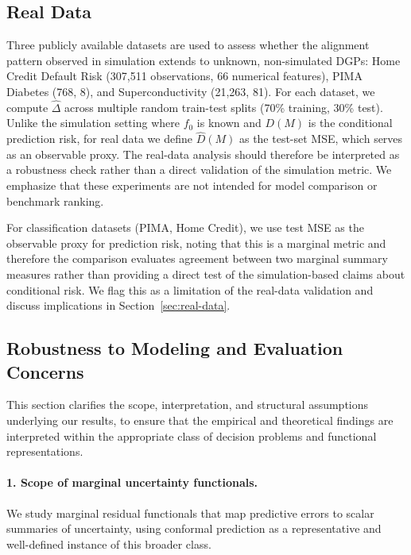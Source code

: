 \documentclass[a4paper,11pt]{article}
\begin{document}
\subsection{Real Data}
\label{sec:real-data-design}

Three publicly available datasets are used to assess whether the alignment pattern observed in simulation extends to unknown, non-simulated DGPs: Home Credit Default Risk (307,511 observations, 66 numerical features), PIMA Diabetes (768, 8), and Superconductivity (21,263, 81). For each dataset, we compute $\hat{\Delta}$ across multiple random train-test splits (70\% training, 30\% test). Unlike the simulation setting where $f_0$ is known and $D(M)$ is the conditional prediction risk, for real data we define $\hat{D}(M)$ as the test-set MSE, which serves as an observable proxy. The real-data analysis should therefore be interpreted as a robustness check rather than a direct validation of the simulation metric. We emphasize that these experiments are not intended for model comparison or benchmark ranking.

For classification datasets (PIMA, Home Credit), we use test MSE as the observable proxy for prediction risk, noting that this is a marginal metric and therefore the comparison evaluates agreement between two marginal summary measures rather than providing a direct test of the simulation-based claims about conditional risk. We flag this as a limitation of the real-data validation and discuss implications in Section~\ref{sec:real-data}.

\subsection*{Robustness to Modeling and Evaluation Concerns}

This section clarifies the scope, interpretation, and structural assumptions underlying our results, to ensure that the empirical and theoretical findings are interpreted within the appropriate class of decision problems and functional representations.

\paragraph{1. Scope of marginal uncertainty functionals.}
We study marginal residual functionals that map predictive errors to scalar summaries of uncertainty, using conformal prediction as a representative and well-defined instance of this broader class.
\end{document}
